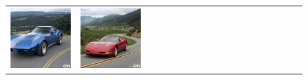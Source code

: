 \begin{figure}[ht!]
\begin{adjustwidth}{-0.8in}{-0.5in}
\begin{tabular}{cccccccccccccccccccc}
\multicolumn{2}{c}{\includegraphics[width=\threebythreecolwidth\textwidth]{figures/cherries/corvette1977.jpg}} &
\multicolumn{2}{c}{\includegraphics[width=\threebythreecolwidth\textwidth]{figures/cherries/corvette1997.jpg}} &

\end{tabular}
\end{adjustwidth}
\end{figure}
